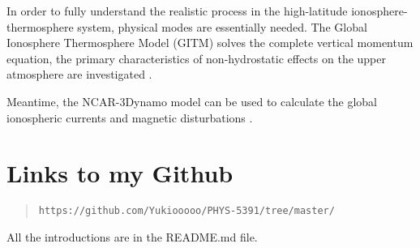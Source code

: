 \documentclass[12pt, letterpaper]{article} %
\begin{document}
In order to fully understand the realistic process in the high-latitude ionosphere-
thermosphere system, physical modes are essentially needed. The Global Ionosphere 
Thermosphere Model (GITM) solves the complete vertical momentum equation, the 
primary characteristics of non-hydrostatic effects on the upper atmosphere are 
investigated \cite[p. 13]{Workayehu2019}. 

Meantime, the NCAR-3Dynamo model can 
be used to calculate the global ionospheric currents and magnetic disturbations 
\citep[see][chap. 5]{Maute2017}.








\section{Links to my Github} %
\begin{quote} 
\begin{verbatim}
https://github.com/Yukiooooo/PHYS-5391/tree/master/
\end{verbatim} %
\end{quote} %

\noindent All the introductions are in the README.md file. 


\clearpage %

\end{document}
